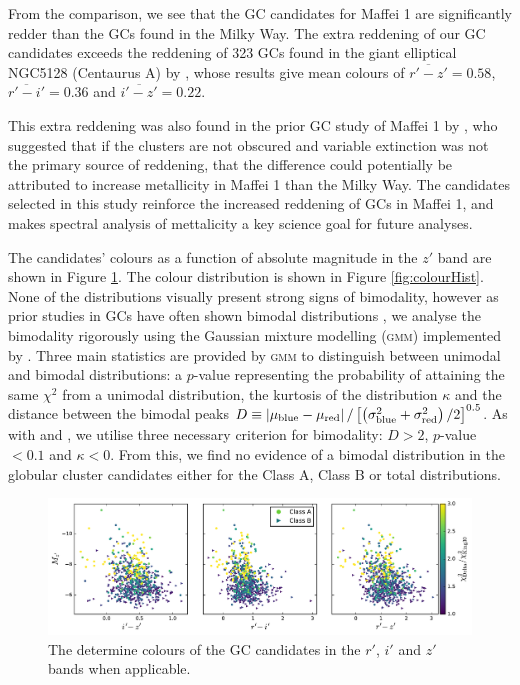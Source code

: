 \documentclass[useAMS,usenatbib]{mn2e}
\begin{document}
 From the comparison, we see that the GC candidates for Maffei 1 are significantly redder than the GCs found in the Milky Way. The extra reddening of our GC candidates exceeds the reddening of 323 GCs found in the giant elliptical NGC5128 (Centaurus A) by \citet{Sinnott2010}, whose results give mean colours of $\overline{r'-z'} = 0.58$, $\overline{r'-i'} = 0.36$ and $\overline{i'-z'} = 0.22$.
 
 This extra reddening was also found in the prior GC study of Maffei 1 by \citet{buta03}, who suggested that if the clusters are not obscured and variable extinction was not the primary source of reddening, that the difference could potentially be attributed to increase metallicity in Maffei 1 than the Milky Way. The candidates selected in this study reinforce the increased reddening of GCs in Maffei 1, and makes spectral analysis of mettalicity a key science goal for future analyses.
 
 The candidates' colours as a function of absolute magnitude in the $z'$ band are shown in Figure \ref{fig:colour}. The colour distribution is shown in Figure \ref{fig:colourHist}. None of the distributions visually present strong signs of bimodality, however as prior studies in GCs have often shown bimodal distributions \citep{Dirsch2003, Salinas2015}, we analyse the bimodality rigorously using the Gaussian mixture modelling (\textsc{gmm}) implemented by \citet{Muratov2010}. Three main statistics are provided by \textsc{gmm} to distinguish between unimodal and bimodal distributions: a $p$-value representing the probability of attaining the same $\chi^2$ from a unimodal distribution, the kurtosis of the distribution $\kappa$ and the distance between the bimodal peaks $D \equiv \left| \mu_{\rm{blue}} - \mu_{\rm{red}}\right|/\left[ \left(\sigma^2_{\rm{blue}} + \sigma^2_{\rm{red}}\right)/2\right]^{0.5}$. As with \citet{Salinas2015} and \citet{Usher2012}, we utilise three necessary criterion for bimodality: $D>2$, $p$-value $ < 0.1$ and $\kappa < 0$. From this, we find no evidence of a bimodal distribution in the globular cluster candidates either for the Class A, Class B or total distributions.
 
 \begin{figure}
 	\includegraphics[width=\textwidth]{images/colour.pdf}
 	\caption{The determine colours of the GC candidates in the $r'$, $i'$ and $z'$ bands when applicable.}
 	\label{fig:colour}
 \end{figure}
 
\end{document}
